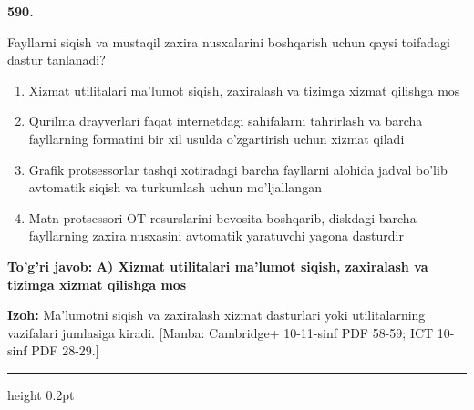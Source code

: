 \documentclass[10pt,a4paper]{article}
\begin{document}
{\bfseries\sffamily\color{ink} 590.}
\par
Fayllarni siqish va mustaqil zaxira nusxalarini boshqarish uchun qaysi toifadagi dastur tanlanadi?
\begin{enumerate}[label=\Alph*),leftmargin=9mm]
\item Xizmat utilitalari ma'lumot siqish, zaxiralash va tizimga xizmat qilishga mos
\item Qurilma drayverlari faqat internetdagi sahifalarni tahrirlash va barcha fayllarning formatini bir xil usulda o'zgartirish uchun xizmat qiladi
\item Grafik protsessorlar tashqi xotiradagi barcha fayllarni alohida jadval bo'lib avtomatik siqish va turkumlash uchun mo'ljallangan
\item Matn protsessori OT resurslarini bevosita boshqarib, diskdagi barcha fayllarning zaxira nusxasini avtomatik yaratuvchi yagona dasturdir
\end{enumerate}
\begin{tcolorbox}[enhanced,breakable,colback=teal!4,colframe=teal!60!black,boxrule=0.45pt,arc=1.2mm,left=2.7mm,right=2.7mm,top=1.8mm,bottom=1.8mm,before skip=2mm,after skip=2mm]
{\bfseries\sffamily\color{teal}To'g'ri javob:} \textbf{A) Xizmat utilitalari ma'lumot siqish, zaxiralash va tizimga xizmat qilishga mos}
\par\smallskip
{\bfseries Izoh:} Ma'lumotni siqish va zaxiralash xizmat dasturlari yoki utilitalarning vazifalari jumlasiga kiradi. [Manba: Cambridge+ 10-11-sinf PDF 58-59; ICT 10-sinf PDF 28-29.]
\end{tcolorbox}
\vspace{2mm}\hrule height 0.2pt\vspace{3mm}
\end{document}
